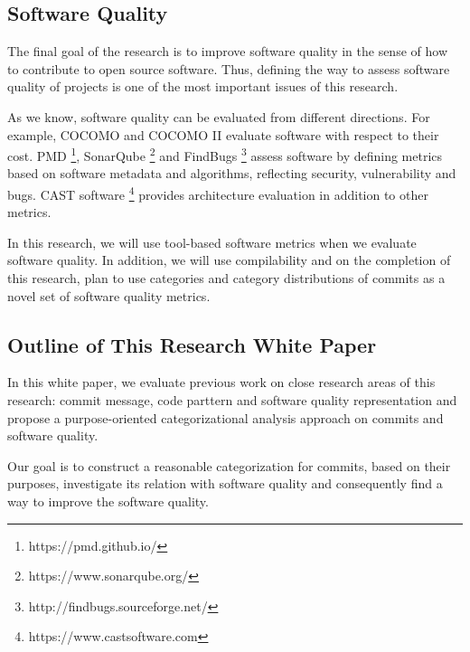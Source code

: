 \subsection{Software Quality}
The final goal of the research is to improve software quality in the sense of how to contribute to open source software. 
Thus, defining the way to assess software quality of projects is one of the most important issues of this research.

As we know, software quality can be evaluated from different directions. 
For example, COCOMO and COCOMO II \cite{cocomo1995} evaluate software with respect to their cost. 
PMD \footnote{https://pmd.github.io/}, SonarQube \footnote{https://www.sonarqube.org/} and FindBugs \footnote{http://findbugs.sourceforge.net/} assess software by defining metrics based on software metadata and algorithms, reflecting security, vulnerability and bugs. 
CAST software \footnote{https://www.castsoftware.com} provides architecture evaluation in addition to other metrics.

In this research, we will use tool-based software metrics when we evaluate software quality.
In addition, we will use compilability and on the completion of this research, plan to use categories and category distributions of commits as a novel set of software quality metrics.


\subsection{Outline of This Research White Paper}
In this white paper, we evaluate previous work on close research areas of this research: commit message, code parttern and software quality representation and propose a purpose-oriented categorizational analysis approach on commits and software quality.

Our goal is to construct a reasonable categorization for commits, based on their purposes, investigate its relation with software quality and consequently find a way to improve the software quality.

